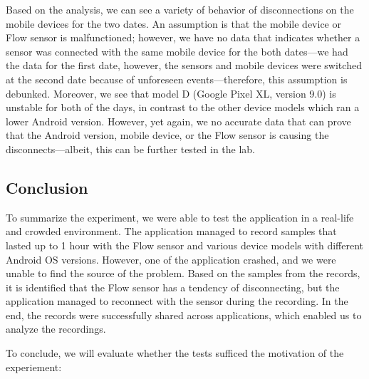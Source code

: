 Based on the analysis, we can see a variety of behavior of disconnections on the mobile devices for the two dates. An assumption is that the mobile device or Flow sensor is malfunctioned; however, we have no data that indicates whether a sensor was connected with the same mobile device for the both dates---we had the data for the first date, however, the sensors and mobile devices were switched at the second date because of unforeseen events---therefore, this assumption is debunked. Moreover, we see that model D (Google Pixel XL, version 9.0) is unstable for both of the days, in contrast to the other device models which ran a lower Android version. However, yet again, we no accurate data that can prove that the Android version, mobile device, or the Flow sensor is causing the disconnects---albeit, this can be further tested in the lab.

\subsection{Conclusion}
To summarize the experiment, we were able to test the application in a real-life and crowded environment. The application managed to record samples that lasted up to 1 hour with the Flow sensor and various device models with different Android OS versions. However, one of the application crashed, and we were unable to find the source of the problem. Based on the samples from the records, it is identified that the Flow sensor has a tendency of disconnecting, but the application managed to reconnect with the sensor during the recording. In the end, the records were successfully shared across applications, which enabled us to analyze the recordings.  

To conclude, we will evaluate whether the tests sufficed the motivation of the experiement:

